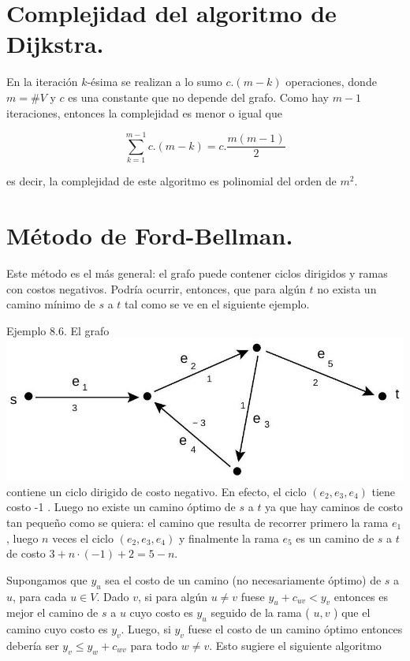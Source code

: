 \documentclass[10pt]{article}
\begin{document}
\section*{Complejidad del algoritmo de Dijkstra.}
En la iteración $k$-ésima se realizan a lo sumo $c .(m-k)$ operaciones, donde $m=\# V$ y $c$ es una constante que no depende del grafo. Como hay $m-1$ iteraciones, entonces la complejidad es menor o igual que

$$
\sum_{k=1}^{m-1} c .(m-k)=c . \frac{m(m-1)}{2}
$$

es decir, la complejidad de este algoritmo es polinomial del orden de $m^{2}$.

\section*{Método de Ford-Bellman.}
Este método es el más general: el grafo puede contener ciclos dirigidos y ramas con costos negativos. Podría ocurrir, entonces, que para algún $t$ no exista un camino mínimo de $s$ a $t$ tal como se ve en el siguiente ejemplo.

Ejemplo 8.6. El grafo\\
\includegraphics[max width=\textwidth, center]{2025_09_05_93c7c1835f249f70c0eeg-33}\\
contiene un ciclo dirigido de costo negativo. En efecto, el ciclo $\left(e_{2}, e_{3}, e_{4}\right)$ tiene costo -1 . Luego no existe un camino óptimo de $s$ a $t$ ya que hay caminos de costo tan pequeño como se quiera: el camino que resulta de recorrer primero la rama $e_{1}$, luego $n$ veces el ciclo $\left(e_{2}, e_{3}, e_{4}\right)$ y finalmente la rama $e_{5}$ es un camino de $s$ a $t$ de costo $3+n \cdot(-1)+2=5-n$.

Supongamos que $y_{u}$ sea el costo de un camino (no necesariamente óptimo) de $s$ a $u$, para cada $u \in V$. Dado $v$, si para algún $u \neq v$ fuese $y_{u}+c_{u v}<y_{v}$ entonces es mejor el camino de $s$ a $u$ cuyo costo es $y_{u}$ seguido de la rama ( $u, v$ ) que el camino cuyo costo es $y_{v}$. Luego, si $y_{v}$ fuese el costo de un camino óptimo entonces debería ser $y_{v} \leq y_{w}+c_{w v}$ para todo $w \neq v$. Esto sugiere el siguiente algoritmo
\end{document}
